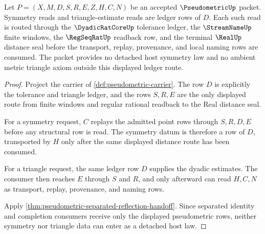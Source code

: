 \begin{theorem}
\label{thm:pseudometric-triangle-ledger-obligation}
Let $P=(X,M,D,S,R,E,Z,H,C,N)$ be an accepted $\PseudometricUp$ packet. Symmetry reads and triangle-estimate reads are ledger rows of $D$. Each such read is routed through the $\DyadicRatCoreUp$ tolerance ledger, the $\StreamNameUp$ finite windows, the $\RegSeqRatUp$ readback row, and the terminal $\RealUp$ distance seal before the transport, replay, provenance, and local naming rows are consumed. The packet provides no detached host symmetry law and no ambient metric triangle axiom outside this displayed ledger route.
\end{theorem}
\begin{proof}
Project the carrier of \autoref{def:pseudometric-carrier}. The row $D$ is explicitly the tolerance and triangle ledger, and the rows $S,R,E$ are the only displayed route from finite windows and regular rational readback to the Real distance seal.

For a symmetry request, $C$ replays the admitted point rows through $S,R,D,E$ before any structural row is read. The symmetry datum is therefore a row of $D$, transported by $H$ only after the same displayed distance route has been consumed.

For a triangle request, the same ledger row $D$ supplies the dyadic estimates. The consumer then reaches $E$ through $S$ and $R$, and only afterward can read $H,C,N$ as transport, replay, provenance, and naming rows.

Apply \autoref{thm:pseudometric-separated-reflection-handoff}. Since separated identity and completion consumers receive only the displayed pseudometric rows, neither symmetry nor triangle data can enter as a detached host law.
\end{proof}

